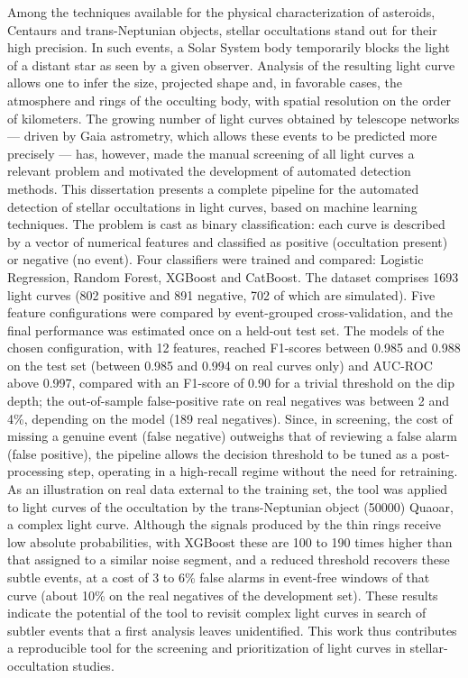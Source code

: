 \documentclass[msc]{on} %
\begin{document}
\begin{foreignabstract}
Among the techniques available for the physical characterization of asteroids, Centaurs and trans-Neptunian objects, stellar occultations stand out for their high precision. In such events, a Solar System body temporarily blocks the light of a distant star as seen by a given observer. Analysis of the resulting light curve allows one to infer the size, projected shape and, in favorable cases, the atmosphere and rings of the occulting body, with spatial resolution on the order of kilometers. The growing number of light curves obtained by telescope networks --- driven by Gaia astrometry, which allows these events to be predicted more precisely --- has, however, made the manual screening of all light curves a relevant problem and motivated the development of automated detection methods. This dissertation presents a complete pipeline for the automated detection of stellar occultations in light curves, based on machine learning techniques. The problem is cast as binary classification: each curve is described by a vector of numerical features and classified as positive (occultation present) or negative (no event). Four classifiers were trained and compared: Logistic Regression, Random Forest, XGBoost and CatBoost. The dataset comprises 1693 light curves (802 positive and 891 negative, 702 of which are simulated). Five feature configurations were compared by event-grouped cross-validation, and the final performance was estimated once on a held-out test set. The models of the chosen configuration, with 12 features, reached F1-scores between 0.985 and 0.988 on the test set (between 0.985 and 0.994 on real curves only) and AUC-ROC above 0.997, compared with an F1-score of 0.90 for a trivial threshold on the dip depth; the out-of-sample false-positive rate on real negatives was between 2 and 4\%, depending on the model (189 real negatives). Since, in screening, the cost of missing a genuine event (false negative) outweighs that of reviewing a false alarm (false positive), the pipeline allows the decision threshold to be tuned as a post-processing step, operating in a high-recall regime without the need for retraining. As an illustration on real data external to the training set, the tool was applied to light curves of the occultation by the trans-Neptunian object (50000) Quaoar, a complex light curve. Although the signals produced by the thin rings receive low absolute probabilities, with XGBoost these are 100 to 190 times higher than that assigned to a similar noise segment, and a reduced threshold recovers these subtle events, at a cost of 3 to 6\% false alarms in event-free windows of that curve (about 10\% on the real negatives of the development set). These results indicate the potential of the tool to revisit complex light curves in search of subtler events that a first analysis leaves unidentified. This work thus contributes a reproducible tool for the screening and prioritization of light curves in stellar-occultation studies.
\end{foreignabstract}
\end{document}
